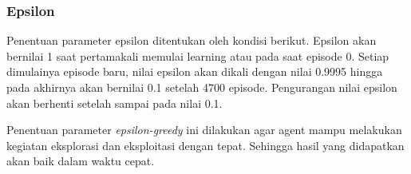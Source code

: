 \documentclass[conference]{IEEEtran}
\begin{document}
\subsubsection{Epsilon}

\begin{table}[H]
	\caption{Hyperparameter epsilon.}
	\label{tb:hyperparameter_epsilon}
\end{table}
Penentuan parameter epsilon ditentukan oleh kondisi berikut. Epsilon akan bernilai 1 saat pertamakali memulai learning atau pada saat episode 0. Setiap dimulainya episode baru, nilai epsilon akan dikali dengan nilai 0.9995 hingga pada akhirnya akan bernilai 0.1 setelah 4700 episode. Pengurangan nilai epsilon akan berhenti setelah sampai pada nilai 0.1.

Penentuan parameter \textit{epsilon-greedy} ini dilakukan agar agent mampu melakukan kegiatan eksplorasi dan eksploitasi dengan tepat. Sehingga hasil yang didapatkan akan baik dalam waktu cepat.
\label{sec:epsilon}

\end{document}
